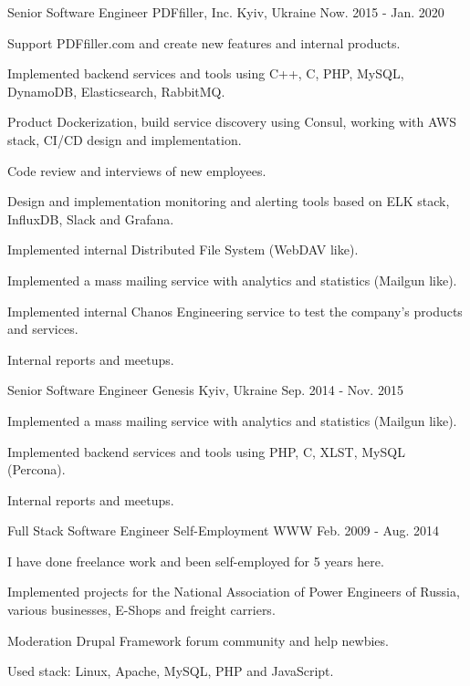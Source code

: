 \begin{cventries}
  \cventry
    {Senior Software Engineer}
    {PDFfiller, Inc.}
    {Kyiv, Ukraine}
    {Now. 2015 - Jan. 2020}
    {
      \begin{cvitems}
        \item {Support PDFfiller.com and create new features and internal products.}
        \item {Implemented backend services and tools using C++, C, PHP, MySQL, DynamoDB, Elasticsearch, RabbitMQ.}
        \item {Product Dockerization, build service discovery using Consul, working with AWS stack, CI/CD design and implementation.}
        \item {Code review and interviews of new employees. }
        \item {Design and implementation monitoring and alerting tools based on ELK stack, InfluxDB, Slack and Grafana.}
        \item {Implemented internal Distributed File System (WebDAV like).}
        \item {Implemented a mass mailing service with analytics and statistics (Mailgun like).}
        \item {Implemented internal Chanos Engineering service to test the company's products and services.}
        \item {Internal reports and meetups.}
      \end{cvitems}
    }

  \cventry
    {Senior Software Engineer}
    {Genesis}
    {Kyiv, Ukraine}
    {Sep. 2014 - Nov. 2015}
    {
      \begin{cvitems}
        \item {Implemented a mass mailing service with analytics and statistics (Mailgun like).}
        \item {Implemented backend services and tools using PHP, C, XLST, MySQL (Percona).}
        \item {Internal reports and meetups.}
      \end{cvitems}
    }

  \cventry
    {Full Stack Software Engineer}
    {Self-Employment}
    {WWW}
    {Feb. 2009 - Aug. 2014}
    {
      \begin{cvitems}
        \item {I have done freelance work and been self-employed for 5 years here.}
        \item {Implemented projects for the National Association of Power Engineers of Russia, various businesses, E-Shops and freight carriers.}
        \item {Moderation Drupal Framework forum community and help newbies.}
        \item {Used stack: Linux, Apache, MySQL, PHP and JavaScript.}
      \end{cvitems}
    }


\end{cventries}
